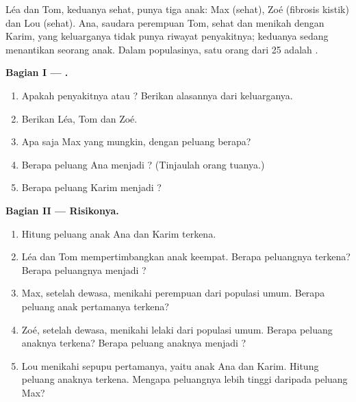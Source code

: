 \begin{problem}
\label{pb:g11:genes-and-disease:1}
Léa dan Tom, keduanya sehat, punya tiga anak: Max (sehat), Zoé
(fibrosis kistik) dan Lou (sehat). Ana, saudara perempuan Tom, sehat
dan menikah dengan Karim, yang keluarganya tidak punya riwayat
penyakitnya; keduanya sedang menantikan seorang anak. Dalam
populasinya, satu orang dari 25 adalah .

\medskip
\noindent\textbf{Bagian I --- .}
\begin{enumerate}
  \item Apakah penyakitnya  atau ? Berikan alasannya dari
        keluarganya.
  \item Berikan  Léa, Tom dan Zoé.
  \item Apa saja  Max yang mungkin, dengan peluang berapa?
  \item Berapa peluang Ana menjadi ? (Tinjaulah orang tuanya.)
  \item Berapa peluang Karim menjadi ?
\end{enumerate}

\medskip
\noindent\textbf{Bagian II --- Risikonya.}
\begin{enumerate}[resume]
  \item Hitung peluang anak Ana dan Karim terkena.
  \item Léa dan Tom mempertimbangkan anak keempat. Berapa peluangnya
        terkena? Berapa peluangnya menjadi ?
  \item Max, setelah dewasa, menikahi perempuan dari populasi umum.
        Berapa peluang anak pertamanya terkena?
  \item Zoé, setelah dewasa, menikahi lelaki dari populasi umum.
        Berapa peluang anaknya terkena? Berapa peluang anaknya menjadi
        ?
  \item Lou menikahi sepupu pertamanya, yaitu anak Ana dan Karim.
        Hitung peluang anaknya terkena. Mengapa peluangnya lebih tinggi
        daripada peluang Max?
\end{enumerate}


\end{problem}
